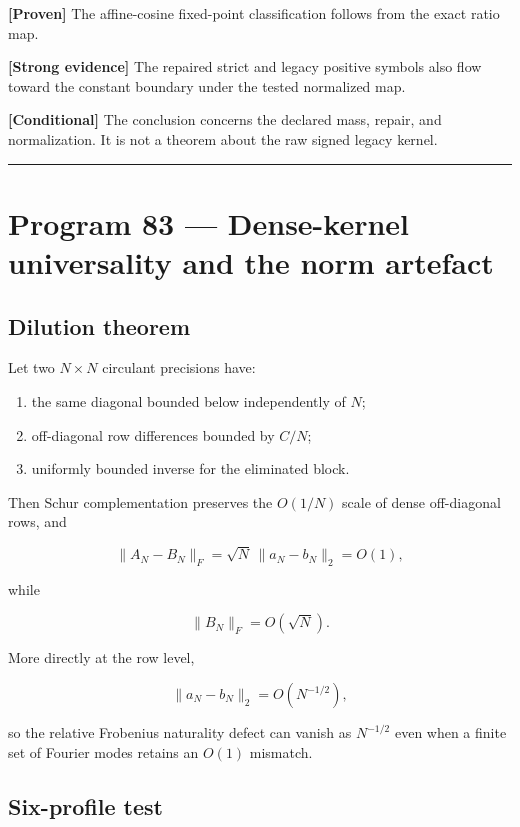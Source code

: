 \documentclass[11pt,a4paper,openany]{report}
\newcommand{\statusProven}{\textcolor{fingreen}{[Proven]}}
\newcommand{\statusStrong}{\textcolor{finblue}{[Strong evidence]}}
\newcommand{\statusConditional}{\textcolor{finorange}{[Conditional]}}
\begin{document}
\textbf{\statusProven{}} The affine-cosine fixed-point classification follows from the exact ratio map.

\textbf{\statusStrong{}} The repaired strict and legacy positive symbols also flow toward the constant boundary under the tested normalized map.

\textbf{\statusConditional{}} The conclusion concerns the declared mass, repair, and normalization. It is not a theorem about the raw signed legacy kernel.

\par\medskip\hrule\medskip

\chapter{Program 83 --- Dense-kernel universality and the norm artefact}

\section{Dilution theorem}

Let two \(N\times N\) circulant precisions have:

\begin{enumerate}
\item 
the same diagonal bounded below independently of \(N\);

\item 
off-diagonal row differences bounded by \(C/N\);

\item 
uniformly bounded inverse for the eliminated block.

\end{enumerate}

Then Schur complementation preserves the \(O(1/N)\) scale of dense off-diagonal rows, and

\[
\|A_N-B_N\|_F
=
\sqrt{N}\,\|a_N-b_N\|_2
=
O(1),
\]

while

\[
\|B_N\|_F=O(\sqrt N).
\]

More directly at the row level,

\[
\|a_N-b_N\|_2
=
O(N^{-1/2}),
\]

so the relative Frobenius naturality defect can vanish as \(N^{-1/2}\) even when a finite set of Fourier modes retains an \(O(1)\) mismatch.

\section{Six-profile test}
\end{document}
